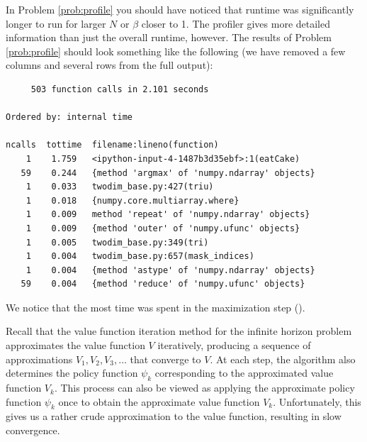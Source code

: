 In Problem \ref{prob:profile} you should have noticed that runtime was significantly longer to run for larger $N$ or
$\beta$ closer to 1.  The profiler gives more detailed information than just the overall runtime, however.
The results of Problem \ref{prob:profile} should look something like the following (we have removed a few
columns and several rows from the full output):
\begin{lstlisting}
     503 function calls in 2.101 seconds

Ordered by: internal time

ncalls  tottime  filename:lineno(function)
    1    1.759   <ipython-input-4-1487b3d35ebf>:1(eatCake)
   59    0.244   {method 'argmax' of 'numpy.ndarray' objects}
    1    0.033   twodim_base.py:427(triu)
    1    0.018   {numpy.core.multiarray.where}
    1    0.009   method 'repeat' of 'numpy.ndarray' objects}
    1    0.009   {method 'outer' of 'numpy.ufunc' objects}
    1    0.005   twodim_base.py:349(tri)
    1    0.004   twodim_base.py:657(mask_indices)
    1    0.004   {method 'astype' of 'numpy.ndarray' objects}
   59    0.004   {method 'reduce' of 'numpy.ufunc' objects}
\end{lstlisting}
We notice that the most time was spent in the maximization step ().

Recall that the value function iteration method for the infinite horizon problem
approximates the value function $V$ iteratively, producing a sequence of
approximations $V_1, V_2, V_3, \ldots$ that converge to $V$.
At each step, the algorithm also determines the policy function $\psi_k$
corresponding to the approximated value function $V_k$.
This process can also be viewed as applying the approximate policy function $\psi_k$ once to obtain
the approximate value function $V_k$.
Unfortunately, this gives us a rather crude approximation to the value function,
resulting in slow convergence.

